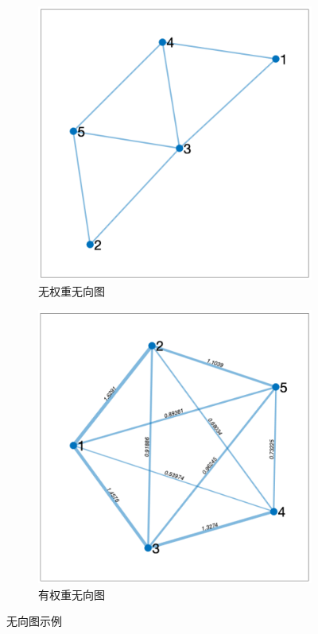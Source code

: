 \begin{figure}[htb!]
    \centering
    \begin{subfigure}{.3\textwidth}
        \centering
        \includegraphics[width=.9\textwidth]{./img/tracking/graph1.pdf}
        \caption{无权重无向图}
        \label{fig_graph_eg_1}
    \end{subfigure}
    \begin{subfigure}{.3\textwidth}
        \centering
        \includegraphics[width=.9\textwidth]{./img/tracking/graph2.pdf}
        \caption{有权重无向图}
        \label{fig_graph_eg_2}
    \end{subfigure}
    \caption{无向图示例}
    \label{fig_graph_eg}
\end{figure}

